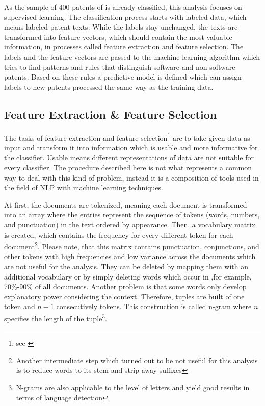 \documentclass[12pt, a4paper]{scrartcl}
\theoremstyle{definition}
\begin{document}
As the sample of 400 patents of \citeauthor{bessen2007empirical} is already
classified, this analysis focuses on supervised learning. The classification
process starts with labeled data, which means labeled patent texts. While the
labels stay unchanged, the texts are transformed into feature vectors, which
should contain the most valuable information, in processes called feature
extraction and feature selection. The labels and the feature vectors are passed
to the machine learning algorithm which tries to find patterns and rules that
distinguish software and non-software patents. Based on these rules a
predictive model is defined which can assign labels to new patents processed
the same way as the training data.

\subsection{Feature Extraction \& Feature Selection} %
\label{ssub:feature_extraction_feature_selection}

The tasks of feature extraction and feature selection\footnote{see
\citet[chapter 6]{bird2009natural}} are to take given data as input and
transform it into information which is usable and more informative for the
classifier. Usable means different representations of data are not suitable for
every classifier. The procedure described here is not what represents a common
way to deal with this kind of problem, instead it is a composition of tools
used in the field of NLP with machine learning techniques.

At first, the documents are tokenized, meaning each document is transformed
into an array where the entries represent the sequence of tokens (words,
numbers, and punctuation) in the text ordered by appearance. Then, a vocabulary
matrix is created, which contains the frequency for every different token for
each document\footnote{Another intermediate step which turned out to be not
useful for this analysis is to reduce words to its stem and strip away
suffixes}. Please note, that this matrix contains punctuation, conjunctions,
and other tokens with high frequencies and low variance across the documents
which are not useful for the analysis. They can be deleted by mapping them with
an additional vocabulary or by simply deleting words which occur in ,for
example, 70\%-90\% of all documents. Another problem is that some words only
develop explanatory power considering the context. Therefore, tuples are built
of one token and $n-1$ consecutively tokens. This construction is called n-gram
where $n$ specifies the length of the tuple\footnote{N-grams are also
applicable to the level of letters and yield good results in terms of language
detection}.
\end{document}
